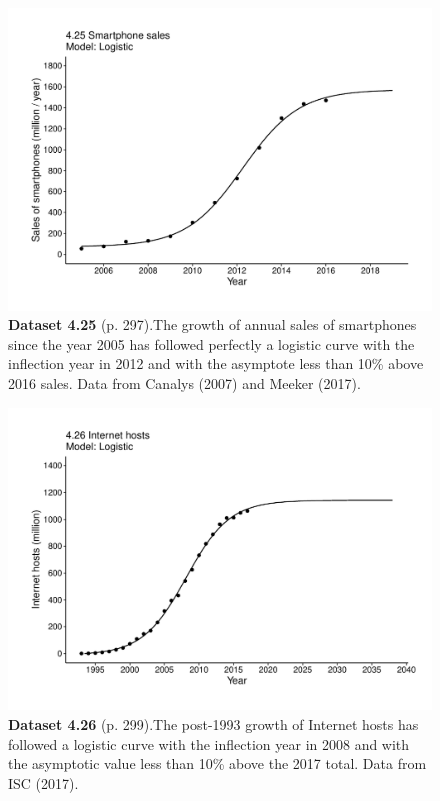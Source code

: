\documentclass[aps,rmp,preprint,superscriptaddress,10pt,onecolumn]{article}
\begin{document}
\clearpage
\begin{figure}[h]
\includegraphics[width=\textwidth]{output/figs-ggplot/4.25.pdf}
\caption*{\textbf{Dataset 4.25} (p. 297).The growth of annual sales of smartphones since the year 2005 has followed perfectly a logistic curve with the inflection year in 2012 and with the asymptote less than 10\% above 2016 sales. Data from Canalys (2007) and Meeker (2017).}
\end{figure}
	
\clearpage
\begin{figure}[h]
\includegraphics[width=\textwidth]{output/figs-ggplot/4.26.pdf}
\caption*{\textbf{Dataset 4.26} (p. 299).The post-1993 growth of Internet hosts has followed a logistic curve with the inflection year in 2008 and with the asymptotic value less than 10\% above the 2017 total. Data from ISC (2017). }
\end{figure}
	
\end{document}
